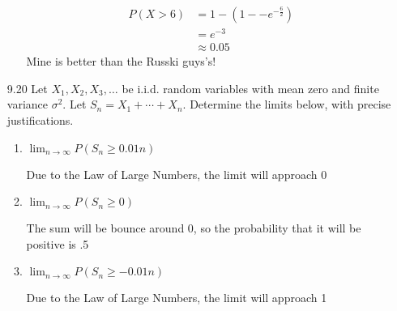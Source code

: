 \documentclass[10pt]{article}
\begin{document}
\begin{itemize}
\begin{enumerate}
        \begin{align*}
          P(X > 6) &= 1 - (1 - -e^{-\frac{6}{2}}) \\
                   &= e ^{-3}\\
                   &\approx 0.05
        \end{align*}
        Mine is better than the Russki guys's!
    \end{enumerate}


\newpage
    \item[9.20]  Let $X_{1}, X_{2}, X_{3}, \ldots$ be i.i.d. random variables with mean zero and finite variance $\sigma^{2}$. Let $S_{n}=X_{1}+\cdots+X_{n}$. Determine the limits below, with precise justifications.

    \begin{enumerate}
      \item  $\lim_{n \rightarrow \infty} P\left(S_{n} \geq 0.01 n\right)$

        Due to the Law of Large Numbers, the limit will approach 0

      \item  $\lim_{n \rightarrow \infty} P\left(S_{n} \geq 0\right)$

        The sum will be bounce around 0, so the probability that it
        will be positive is .5

      \item  $\lim_{n \rightarrow \infty} P\left(S_{n} \geq-0.01 n\right)$

        Due to the Law of Large Numbers, the limit will approach 1
    \end{enumerate}
\end{itemize}
\end{document}
